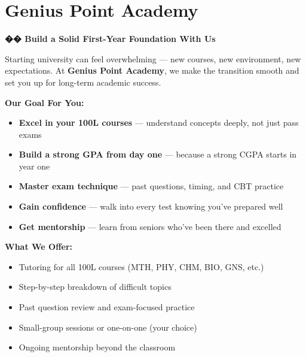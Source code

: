 \documentclass[11pt,a4paper]{article}
\begin{document}
\section{Genius Point Academy}

\begin{gpabox}
    {\color{accent}\huge\bfseries �� Build a Solid First-Year Foundation With Us}

    \vspace{0.7em}

    {\color{white}Starting university can feel overwhelming --- new courses, new environment, new expectations. At \textbf{Genius Point Academy}, we make the transition smooth and set you up for long-term academic success.}

    \vspace{0.7em}

    {\color{accent}\large\bfseries Our Goal For You:}

    \vspace{0.3em}

    {\color{white}
    \begin{itemize}[leftmargin=1.5em, itemsep=0.3em]
        \item \textbf{Excel in your 100L courses} --- understand concepts deeply, not just pass exams
        \item \textbf{Build a strong GPA from day one} --- because a strong CGPA starts in year one
        \item \textbf{Master exam technique} --- past questions, timing, and CBT practice
        \item \textbf{Gain confidence} --- walk into every test knowing you've prepared well
        \item \textbf{Get mentorship} --- learn from seniors who've been there and excelled
    \end{itemize}}

    \vspace{0.5em}

    {\color{accent}\large\bfseries What We Offer:}

    \vspace{0.3em}

    {\color{white}
    \begin{itemize}[leftmargin=1.5em, itemsep=0.3em]
        \item Tutoring for all 100L courses (MTH, PHY, CHM, BIO, GNS, etc.)
        \item Step-by-step breakdown of difficult topics
        \item Past question review and exam-focused practice
        \item Small-group sessions or one-on-one (your choice)
        \item Ongoing mentorship beyond the classroom
    \end{itemize}}


\end{gpabox}
\end{document}
